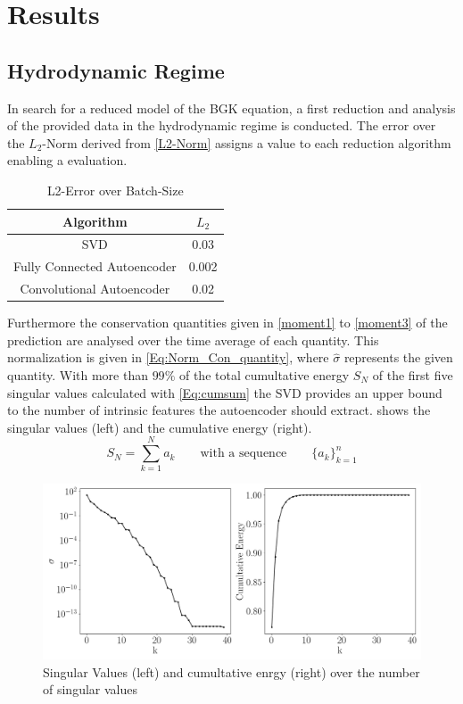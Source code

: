 \documentclass[12pt, a4paper]{article}
\begin{document}
\section{Results}\label{Results}
\subsection{Hydrodynamic Regime}
In search for a reduced model of the BGK equation, a first reduction and analysis of the provided data in the hydrodynamic regime is conducted. The error over the $L_2$-Norm derived from \cref{L2-Norm} assigns a value to each reduction algorithm enabling a evaluation.
\begin{table}[!htbp]\centering
	\begin{tabular}{ |c c| }
		\hline
		Algorithm & $L_2$ \\[.5ex]
		\hline
		SVD & 0.03  \\ 
		Fully Connected Autoencoder & 0.002 \\ 
		Convolutional Autoencoder & 0.02 \\ \hline
		\hline
	\end{tabular}
	\caption{L2-Error over Batch-Size}
	\label{Tab:Batch}
\end{table}
Furthermore the conservation quantities given in \cref{moment1} to \cref{moment3} of the prediction are analysed over the time average of each quantity. This normalization is given in \cref{Eq:Norm_Con_quantity}, where $\hat{\sigma}$ represents the given quantity.  
With more than $99\%$ of the total cumultative energy $S_N$ of the first five singular values calculated with \cref{Eq:cumsum} the SVD provides an upper bound to the number of intrinsic features the autoencoder should extract.  shows the singular values (left) and the cumulative energy (right).
\begin{equation}
S_N = \sum_{k=1}^{N}a_k \qquad\textrm{with a sequence} \qquad\{a_k\}_{k=1}^{n} 
\label{Eq:cumsum}
\end{equation}  
\begin{figure}[!htbp]
	\centering
	\includegraphics[width=\textwidth]{Figures/Cumultative_Singular_Values_kn001.png}
	\caption{Singular Values (left) and cumultative enrgy (right) over the number of singular values}
	\label{Fig:cumu_sing}
\end{figure}
\end{document}
